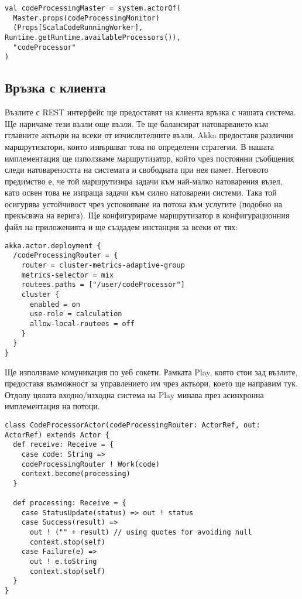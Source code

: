 \begin{lstlisting}
val codeProcessingMaster = system.actorOf(
  Master.props(codeProcessingMonitor)
  (Props[ScalaCodeRunningWorker], Runtime.getRuntime.availableProcessors()),
  "codeProcessor"
)
\end{lstlisting}

\subsection{Връзка с клиента}

Възлите с REST интерфейс ще предоставят на клиента връзка с нашата система. Ще наричаме тези възли още  възли. Те ще балансират натоварването към гглавните актьори на всеки от изчислителните възли. Akka предоставя различни маршрутизатори, които извършват това по определени стратегии. В нашата имплементация ще използваме маршрутизатор, който чрез постоянни съобщения следи натовареността на системата и свободната при нея памет. Неговото предимство е, че той маршрутизира задачи към най-малко натоварения възел, като освен това не изпраща задачи към силно натоварени системи. Така той осигурява устойчивост чрез успокояване на потока към услугите (подобно на прекъсвача на верига). Ще конфигурираме маршрутизатор в конфигурационния файл на  приложенията и ще създадем инстанция за всеки от тях:

\begin{lstlisting}
akka.actor.deployment {
  /codeProcessingRouter = {
    router = cluster-metrics-adaptive-group
    metrics-selector = mix
    routees.paths = ["/user/codeProcessor"]
    cluster {
      enabled = on
      use-role = calculation
      allow-local-routees = off
    }
  }
}
\end{lstlisting}

Ще използваме комуникация по уеб сокети. Рамката Play, която стои зад  възлите, предоставя възможност за управлението им чрез актьори, което ще направим тук. Отдолу цялата входно/изходна система на Play минава през асинхронна  имплементация на потоци.

\begin{lstlisting}
class CodeProcessorActor(codeProcessingRouter: ActorRef, out: ActorRef) extends Actor {
  def receive: Receive = {
    case code: String =>
    codeProcessingRouter ! Work(code)
    context.become(processing)
  }
    
  def processing: Receive = {
    case StatusUpdate(status) => out ! status
    case Success(result) =>
      out ! ("" + result) // using quotes for avoiding null
      context.stop(self)
    case Failure(e) =>
      out ! e.toString
      context.stop(self)
  }
}
\end{lstlisting}

